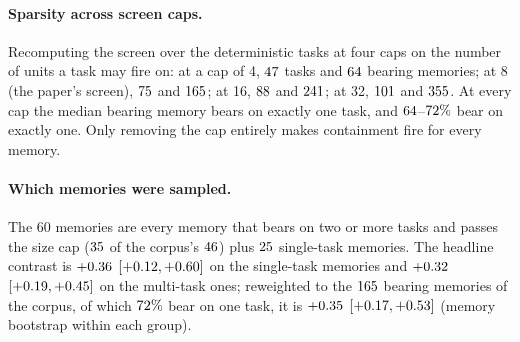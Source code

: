 \paragraph{Sparsity across screen caps.} Recomputing the screen over the
deterministic tasks at four caps on the number of units a task may fire on:
at a cap of 4, $47$ tasks and $64$ bearing memories;
at 8 (the paper's screen), $75$ and $165$; at 16,
$88$ and $241$; at 32, $101$ and
$355$. At every cap the median bearing memory bears on exactly one
task, and $64$--$72\%$ bear on exactly one. Only removing the
cap entirely makes containment fire for every memory.

\paragraph{Which memories were sampled.} The 60 memories are every memory that
bears on two or more tasks and passes the size cap ($35$ of the
corpus's $46$) plus $25$ single-task memories. The headline
contrast is $+0.36$ $[+0.12, +0.60]$ on the
single-task memories and $+0.32$ $[+0.19, +0.45]$ on the
multi-task ones; reweighted to the $165$ bearing memories of the corpus, of
which $72\%$ bear on one task, it is $+0.35$
$[+0.17, +0.53]$ (memory bootstrap within each group).


